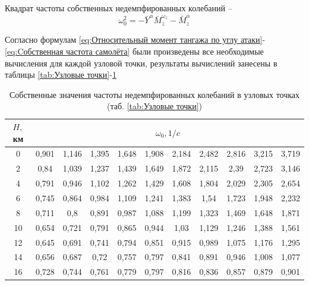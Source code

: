     
    Квадрат частоты собственных недемпфированных колебаний --
    \begin{equation}
        \label{eq:Cобственная частота самолёта}
        \omega_0^2=-\bar{Y}^\alpha \bar{M}_z^{\omega_z}-\bar{M}_z^{\alpha}
    \end{equation}
    
    Согласно формулам \ref{eq:Относительный момент тангажа по углу атаки}-\ref{eq:Cобственная частота самолёта} были произведены все необходимые вычисления для каждой узловой точки, результаты вычислений занесены в таблицы \ref{tab:Узловые точки}-\ref{tab:Собственные значения частоты недемпфированных колебаний в узловых точках}


     \begin{table}[H]
    \centering
    \caption{Собственные значения частоты недемпфированных колебаний в узловых точках (таб. \ref{tab:Узловые точки})}
    \label{tab:Собственные значения частоты недемпфированных колебаний в узловых точках}
    \begin{tabular}{|c|c|c|c|c|c|c|c|c|c|c|}
    \hline
        $H,$ км &\multicolumn{10}{|c|}{$\omega_0, 1/c$} \\ \hline
        0 & 0,901 & 1,146 & 1,395 & 1,648 & 1,908 & 2,184 & 2,482 & 2,816 & 3,215 & 3,719  \\ \hline
        2 & 0,84 & 1,039 & 1,237 & 1,439 & 1,649 & 1,872 & 2,115 & 2,39 & 2,723 & 3,146  \\ \hline
        4 & 0,791 & 0,946 & 1,102 & 1,262 & 1,429 & 1,608 & 1,804 & 2,029 & 2,305 & 2,654  \\ \hline
        6 & 0,745 & 0,864 & 0,984 & 1,109 & 1,241 & 1,383 & 1,54 & 1,723 & 1,948 & 2,232  \\ \hline
        8 & 0,711 & 0,8 & 0,891 & 0,987 & 1,088 & 1,199 & 1,323 & 1,469 & 1,648 & 1,871  \\ \hline
        10 & 0,654 & 0,721 & 0,791 & 0,865 & 0,944 & 1,03 & 1,129 & 1,246 & 1,388 & 1,561  \\ \hline
        12 & 0,645 & 0,691 & 0,741 & 0,794 & 0,851 & 0,915 & 0,989 & 1,075 & 1,176 & 1,295  \\ \hline
        14 & 0,656 & 0,687 & 0,72 & 0,757 & 0,797 & 0,841 & 0,891 & 0,946 & 1,008 & 1,077  \\ \hline
        16 & 0,728 & 0,744 & 0,761 & 0,779 & 0,797 & 0,816 & 0,836 & 0,857 & 0,879 & 0,901  \\ \hline
    \end{tabular}
\end{table}


